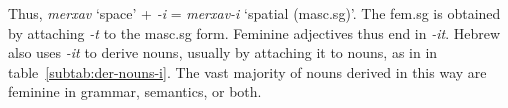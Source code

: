 \begin{table}[ht]
\end{table}
Thus, \textit{merxav} `space' + \textit{-i} = \textit{merxav-i} 
`spatial (masc.sg)'. The fem.sg is obtained by attaching \textit{-t} to the masc.sg
form. Feminine adjectives thus end in \textit{-it}. 
Hebrew also uses \textit{-it} to derive nouns, usually by attaching it 
to nouns, as in in table~\ref{subtab:der-nouns-i}. 
The vast majority of nouns derived in this way are feminine in 
grammar, semantics, or both. 




